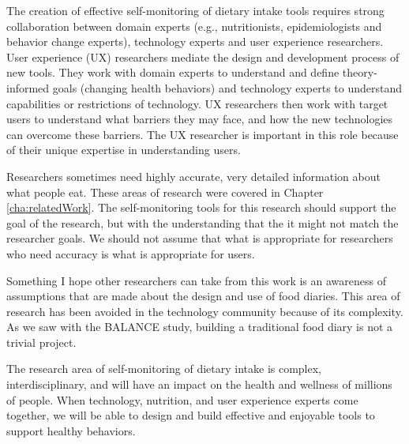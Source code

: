The creation of effective self-monitoring of dietary intake tools requires strong collaboration between domain experts (e.g., nutritionists, epidemiologists and behavior change experts), technology experts and user experience researchers. User experience (UX) researchers mediate the design and development process of new tools. They work with domain experts to understand and define theory-informed goals (changing health behaviors) and technology experts to understand capabilities or restrictions of technology. UX researchers then work with target users to understand what barriers they may face, and how the new technologies can overcome these barriers. The UX researcher is important in this role because of their unique expertise in understanding users. 

Researchers sometimes need highly accurate, very detailed information about what people eat. These areas of research were covered in Chapter \ref{cha:relatedWork}. The self-monitoring tools for this research should support the goal of the research, but with the understanding that the it might not match the researcher goals. We should not  assume that what is appropriate for researchers who need accuracy is what is appropriate for users. 

Something I hope other researchers can take from this work is an awareness of assumptions that are made about the design and use of food diaries. This area of research has been avoided in the technology community because of its complexity. As we saw with the BALANCE study, building a traditional food diary is not a trivial project. 


The research area of self-monitoring of dietary intake is complex, interdisciplinary, and will have an impact on the health and wellness of millions of people. When technology, nutrition, and user experience experts come together, we will be able to design and build effective and enjoyable tools to support healthy behaviors. 

